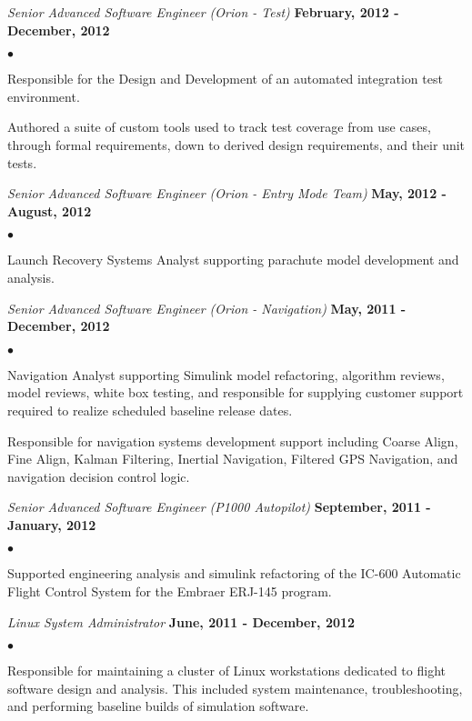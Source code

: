 \documentclass[margin,line]{res}
\newenvironment{list2}{
  \begin{list}{$\bullet$}{%
      \setlength{\itemsep}{0in}
      \setlength{\parsep}{0in} \setlength{\parskip}{0in}
      \setlength{\topsep}{0in} \setlength{\partopsep}{0in} 
      \setlength{\leftmargin}{0.2in}}}{\end{list}}
\begin{document}
\begin{resume}
\vspace{-.3cm}
{\em Senior Advanced Software Engineer (Orion - Test)} \hfill {\bf February, 2012 - December, 2012} \vspace*{.05in}
\begin{list2}
\item Responsible for the Design and Development of an automated integration test environment.
\item Authored a suite of custom tools used to track test coverage from use cases, through formal requirements, down to derived design requirements, and their unit tests. 
\end{list2}
{\em Senior Advanced Software Engineer (Orion - Entry Mode Team)} \hfill {\bf May, 2012 - August, 2012} \vspace*{.05in} 
\begin{list2}
\item Launch Recovery Systems Analyst supporting parachute model development and analysis.
\end{list2}
{\em Senior Advanced Software Engineer (Orion - Navigation)} \hfill {\bf May, 2011 - December, 2012}
\vspace*{.05in}
\begin{list2}
\item Navigation Analyst supporting Simulink model refactoring, algorithm reviews, model reviews, white box testing, and responsible for supplying customer support required to realize scheduled baseline release dates.
\item Responsible for navigation systems development support including Coarse Align, Fine Align, Kalman Filtering, Inertial Navigation, Filtered GPS Navigation, and navigation decision control logic.
\end{list2}
{\em Senior Advanced Software Engineer (P1000 Autopilot)} \hfill {\bf September, 2011 - January, 2012}
\vspace*{.05in}
\begin{list2}
\item Supported engineering analysis and simulink refactoring of the IC-600 Automatic Flight Control System for the Embraer ERJ-145 program.
\end{list2}
{\em Linux System Administrator} \hfill {\bf June, 2011 - December, 2012}
\vspace*{.05in}
\begin{list2}
\item Responsible for maintaining a cluster of Linux workstations dedicated to flight software design and analysis.  This included system maintenance, troubleshooting, and performing baseline builds of simulation software.

\end{list2}
\end{resume}
\end{document}
